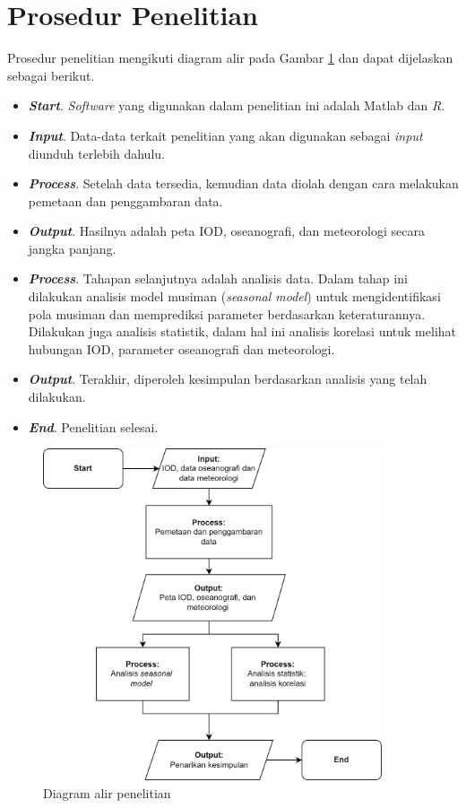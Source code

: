 \section[Prosedur Penelitian]{Prosedur Penelitian}
\begin{spacing}{1.5}
	Prosedur penelitian mengikuti diagram alir pada Gambar \ref{fig:flowchart} dan dapat dijelaskan sebagai berikut. 
	\begin{itemize}
		\item \textbf{\textit{Start}}. \textit{Software} yang digunakan dalam penelitian ini adalah Matlab dan \textit{R}.
		\item \textbf{\textit{Input}}. Data-data terkait penelitian yang akan digunakan sebagai \textit{input} diunduh terlebih dahulu.
		\item \textbf{\textit{Process}}. Setelah data tersedia, kemudian data diolah dengan cara melakukan pemetaan dan penggambaran data.
		\item \textbf{\textit{Output}}. Hasilnya adalah peta IOD, oseanografi, dan meteorologi secara jangka panjang. 
		\item \textbf{\textit{Process}}. Tahapan selanjutnya adalah analisis data. Dalam tahap ini dilakukan analisis model musiman (\textit{seasonal model}) untuk mengidentifikasi pola musiman dan memprediksi parameter berdasarkan keteraturannya. Dilakukan juga analisis statistik, dalam hal ini analisis korelasi untuk melihat hubungan IOD, parameter oseanografi dan meteorologi.
		\item \textbf{\textit{Output}}. Terakhir, diperoleh kesimpulan berdasarkan analisis yang telah dilakukan.
		\item \textbf{\textit{End}}. Penelitian selesai.
	\end{itemize}
	\begin{figure}[H]
		\centering
		\includegraphics[width=10cm]{contents/Figures/Flowchart_Diagram.png}
		\caption{Diagram alir penelitian}
		\label{fig:flowchart}
	\end{figure}
\end{spacing}
